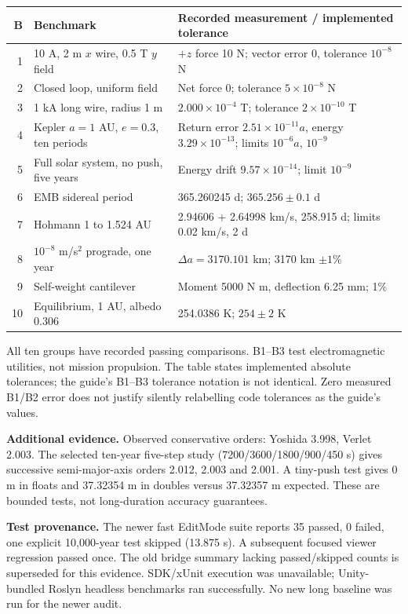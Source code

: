 ﻿\documentclass[10pt,a4paper]{article}
\begin{document}
\par\smallskip
{\small\noindent\begin{tabularx}{\linewidth}{@{}r L{49mm} X@{}}\toprule
B & Benchmark & Recorded measurement / implemented tolerance\\ & 10 A, 2 m $x$ wire, 0.5 T $y$ field & $+z$ force 10 N; vector error 0, tolerance $10^{-8}$ N\\
2 & Closed loop, uniform field & Net force 0; tolerance $5\times10^{-8}$ N\\
3 & 1 kA long wire, radius 1 m & $2.000\times10^{-4}$ T; tolerance $2\times10^{-10}$ T\\
4 & Kepler $a=1$ AU, $e=0.3$, ten periods & Return error $2.51\times10^{-11}a$, energy $3.29\times10^{-13}$; limits $10^{-6}a$, $10^{-9}$\\
5 & Full solar system, no push, five years & Energy drift $9.57\times10^{-14}$; limit $10^{-9}$\\
6 & EMB sidereal period & 365.260245 d; $365.256\pm0.1$ d\\
7 & Hohmann 1 to 1.524 AU & 2.94606 + 2.64998 km/s, 258.915 d; limits 0.02 km/s, 2 d\\
8 & $10^{-8}$ m/s$^2$ prograde, one year & $\Delta a=3170.101$ km; 3170 km $\pm1\%$\\
9 & Self-weight cantilever & Moment 5000 N m, deflection 6.25 mm; 1\%\\
10 & Equilibrium, 1 AU, albedo 0.306 & 254.0386 K; $254\pm2$ K\\\bottomrule
\end{tabularx}\par}
\smallskip

All ten groups have recorded passing comparisons. B1--B3 test electromagnetic utilities, not mission propulsion. The table states implemented absolute tolerances; the guide's B1--B3 tolerance notation is not identical. Zero measured B1/B2 error does not justify silently relabelling code tolerances as the guide's values.

\textbf{Additional evidence.} Observed conservative orders: Yoshida 3.998, Verlet 2.003. The selected ten-year five-step study (7200/3600/1800/900/450 s) gives successive semi-major-axis orders 2.012, 2.003 and 2.001. A tiny-push test gives 0 m in floats and 37.32354 m in doubles versus 37.32357 m expected. These are bounded tests, not long-duration accuracy guarantees.

\textbf{Test provenance.} The newer fast EditMode suite reports 35 passed, 0 failed, one explicit 10,000-year test skipped (13.875 s). A subsequent focused viewer regression passed once. The old bridge summary lacking passed/skipped counts is superseded for this evidence. SDK/xUnit execution was unavailable; Unity-bundled Roslyn headless benchmarks ran successfully. No new long baseline was run for the newer audit.
\end{document}
